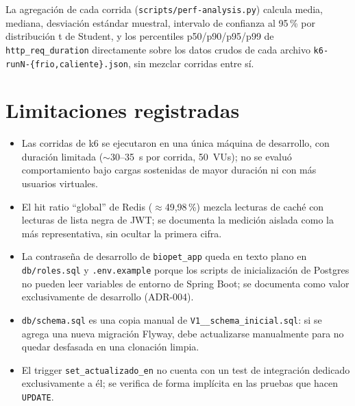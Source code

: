 La agregaci\'on de cada corrida (\texttt{scripts/perf-analysis.py}) calcula
media, mediana, desviaci\'on est\'andar muestral, intervalo de confianza al
95\,\% por distribuci\'on t de Student, y los percentiles p50/p90/p95/p99
de \texttt{http_req_duration} directamente sobre los datos crudos de cada
archivo \texttt{k6-runN-\{frio,caliente\}.json}, sin mezclar corridas entre
s\'i.

\section{Limitaciones registradas}

\begin{itemize}[nosep]
  \item Las corridas de k6 se ejecutaron en una \'unica m\'aquina de
    desarrollo, con duraci\'on limitada ($\sim$30--35~s por corrida, 50~VUs);
    no se evalu\'o comportamiento bajo cargas sostenidas de mayor duraci\'on
    ni con m\'as usuarios virtuales.
  \item El hit ratio ``global'' de Redis ($\approx$49{,}98\,\%) mezcla
    lecturas de cach\'e con lecturas de lista negra de JWT; se documenta la
    medici\'on aislada como la m\'as representativa, sin ocultar la
    primera cifra.
  \item La contrase\~na de desarrollo de \texttt{biopet_app} queda en texto
    plano en \texttt{db/roles.sql} y \texttt{.env.example} porque los
    scripts de inicializaci\'on de Postgres no pueden leer variables de
    entorno de Spring Boot; se documenta como valor exclusivamente de
    desarrollo (ADR-004).
  \item \texttt{db/schema.sql} es una copia manual de
    \texttt{V1__schema_inicial.sql}: si se agrega una nueva migraci\'on
    Flyway, debe actualizarse manualmente para no quedar desfasada en una
    clonaci\'on limpia.
  \item El trigger \texttt{set_actualizado_en} no cuenta con un test de
    integraci\'on dedicado exclusivamente a \'el; se verifica de forma
    impl\'icita en las pruebas que hacen \texttt{UPDATE}.
\end{itemize}

